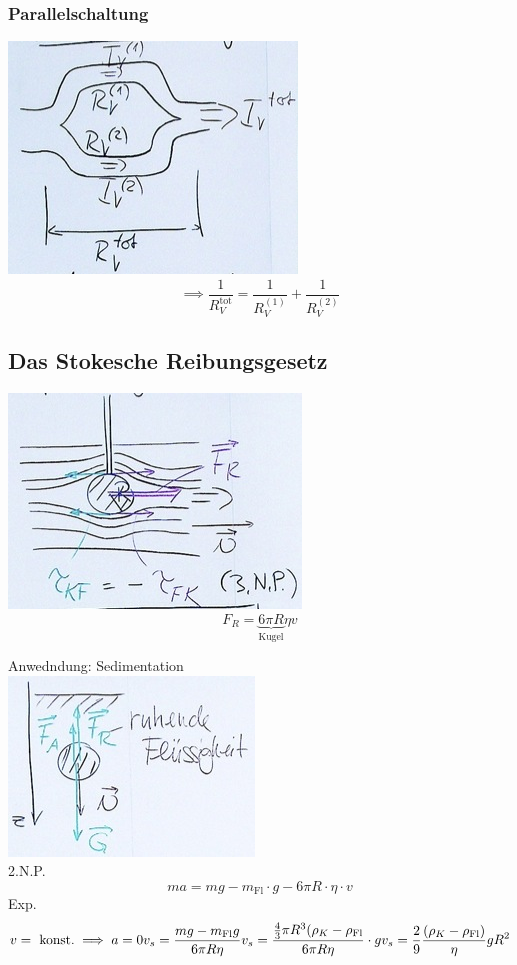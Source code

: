 \subsubsection{Parallelschaltung}
\includegraphics{Bild99}
\[ \implies \frac{1}{R_V^{\text{tot}}} = \frac{1}{R_V^{(1)}} + \frac{1}{R_V^{(2)}} \]

\subsection{Das Stokesche Reibungsgesetz}
\begin{bsp*}[ note = Kugel in Strömung ]
	\includegraphics{Bild100}
	\[ F_R = \underbrace{6 \pi R}_{\text{Kugel}} \eta v \]
\end{bsp*}

Anwedndung: Sedimentation \\
\includegraphics{Bild101} \\
2.N.P.
\[ ma = mg - m_{\text{Fl}} \cdot g - 6\pi R \cdot \eta \cdot v \]
Exp.
\[
	v = \text{ konst.} \implies a = 0 \\
	v_s = \frac{mg - m_{\text{Fl}} g}{6 \pi R \eta} \\
	v_s = \frac{\frac{4}{3} \pi R^3 (\rho_{K} - \rho_{\text{Fl}}}{6 \pi R \eta} \cdot g \\
	v_s = \frac{2}{9} \frac{( \rho_K - \rho_{\text{Fl}} )}{\eta} g R^2
\]

